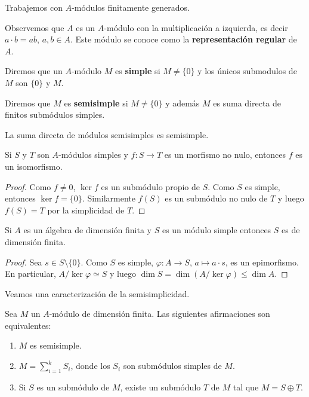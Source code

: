 Trabajemos con $A$-módulos finitamente generados. 

Observemos que $A$ es un $A$-módulo con la multiplicación a izquierda, es decir $a\cdot b=ab$, $a,b\in A$.
Este módulo se conoce como la \textbf{representación regular} de $A$. 

\begin{definition}
Diremos que un $A$-módulo $M$ es
\textbf{simple} si $M\ne\{0\}$ y los únicos submodulos de $M$ son $\{0\}$ y $M$. 
\end{definition}

\begin{definition}
Diremos que $M$ es \textbf{semisimple} si $M\ne\{0\}$ y además $M$
es suma directa de finitos submódulos simples. 
\end{definition}

La suma directa de módulos semisimples es semisimple. 

\begin{lemma}[Schur]
Si $S$ y $T$ son $A$-módulos simples y $f\colon S\to T$ es un morfismo no nulo, entonces
$f$ es un isomorfismo. 	
\end{lemma}

\begin{proof}
Como $f\ne 0$, $\ker f$ es un submódulo propio de $S$. Como $S$ es simple, entonces $\ker f=\{0\}$. Similarmente $f(S)$ 
es un submódulo no nulo de $T$ y luego $f(S)=T$ por la simplicidad de $T$. 	
\end{proof}

\begin{proposition}
    Si $A$ es un álgebra de dimensión finita y $S$ es un módulo simple 
    entonces $S$ es de dimensión finita.
\end{proposition}

\begin{proof}
    Sea $s\in S\setminus\{0\}$. Como $S$ es simple, $\varphi\colon A\to S$, $a\mapsto a\cdot s$, es
    un epimorfismo. En particular, $A/\ker\varphi\simeq S$ y luego $\dim S=\dim (A/\ker\varphi)\leq \dim A$. 
\end{proof}

Veamos una caracterización de la semisimplicidad.
 
\begin{proposition}
\label{pro:semisimple}
	Sea $M$ un $A$-módulo de dimensión finita. Las siguientes afirmaciones son equivalentes:
	\begin{enumerate}
		\item $M$ es semisimple.
		\item $M=\sum_{i=1}^k S_i$, donde los $S_i$ son submódulos simples de $M$.
		\item Si $S$ es un submódulo de $M$, existe un submódulo $T$ de $M$ tal que $M=S\oplus T$.    
	\end{enumerate}
\end{proposition}

